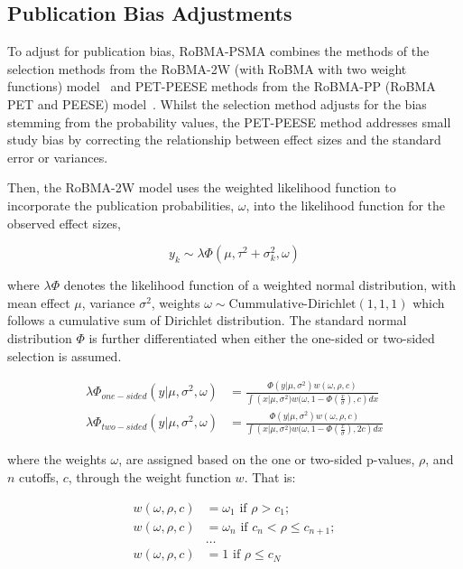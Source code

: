 \documentclass[a4paper, 12pt]{article}
\begin{document}
    \subsection{Publication Bias Adjustments}\label{subsec1.0.1:publication-bias-adjustments}
    To adjust for publication bias, RoBMA-PSMA combines the methods of the selection methods from the RoBMA-2W (with RoBMA with two weight functions) model~\parencite{maier2022} and PET-PEESE methods from the RoBMA-PP (RoBMA PET and PEESE) model~\parencite{bartos2021, bartos2022}. Whilst the selection method adjusts for the bias stemming from the probability values, the PET-PEESE method addresses small study bias by correcting the relationship between effect sizes and the standard error or variances.

    Then, the RoBMA-2W model uses the weighted likelihood function to incorporate the publication probabilities, $\omega$, into the likelihood function for the observed effect sizes,

    \begin{equation}
        \label{equ4:robma-2w}
        y_k \sim \lambda\Phi \left(\mu, \tau^{2} + \sigma_k^{2}, \omega \right)
    \end{equation}

    where $\lambda \Phi$ denotes the likelihood function of a weighted normal distribution, with mean effect $\mu$, variance $\sigma^2$, weights $\omega \sim \text{Cummulative-Dirichlet}(1,1,1)$ which follows a cumulative sum of Dirichlet distribution. The standard normal distribution $\Phi$ is further differentiated when either the one-sided or two-sided selection is assumed.

    \begin{align}
        \lambda\Phi_{one-sided}(y | \mu, \sigma^{2}, \omega) &= \frac{\Phi(y | \mu, \sigma^{2}) w(\omega, \rho, c)}{\int \left(x | \mu, \sigma^{2}) w(\omega, 1 - \Phi(\frac{x}{\sigma}), c \right) dx} \label{equ5:robma-2w-sel} \\
        \lambda\Phi_{two-sided}(y | \mu, \sigma^{2}, \omega) &= \frac{\Phi(y | \mu, \sigma^{2}) w(\omega, \rho,  c)}{\int \left(x | \mu, \sigma^{2}) w(\omega, 1 - \Phi(\frac{x}{\sigma}), 2c \right) dx} \label{equ6:robma-2w-sel}
    \end{align}

    where the weights $\omega$, are assigned based on the one or two-sided p-values, $\rho$, and $n$ cutoffs, $c$, through the weight function $w$. That is:

    \begin{equation}
        \begin{split}
            \label{equ7:robma-2w-cutoffs}
            w(\omega, \rho, c) &= \omega_1 \text{ if } \rho > c_1; \\
            w(\omega, \rho, c) &= \omega_n \text{ if } c_n < \rho \leqslant c_{n + 1}; \\
            &\dots \\
            w(\omega, \rho, c) &= 1 \text{ if } \rho \leqslant c_N \\
        \end{split}
    \end{equation}
\end{document}
